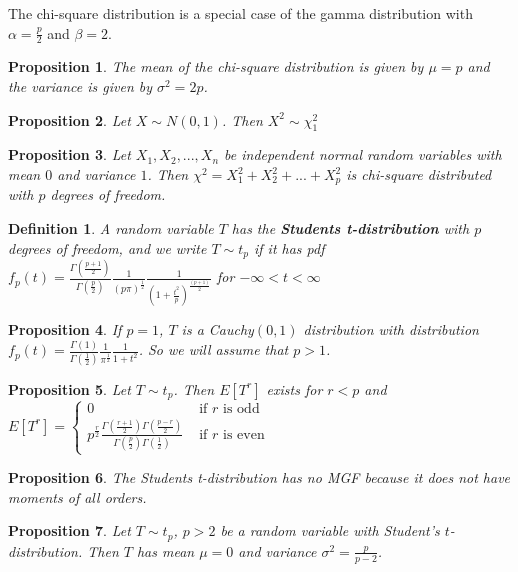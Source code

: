 \documentclass[14pt,twoside]{extreport}
\theoremstyle{dotless}
\newtheorem*{defn}{Definition}
\newtheorem*{prop}{Proposition} %
\begin{document}
The chi-square distribution is a special case of the gamma distribution with $\alpha = \frac{p}{2}$ and $\beta = 2$.

\begin{prop}
The mean of the chi-square distribution is given by $\mu = p$ and the variance is given by $\sigma^2 = 2p$.
\end{prop}

\begin{prop}
Let $X \sim N(0,1)$. Then $X^2 \sim \chi_1^2$
\end{prop}

\begin{prop}
    Let $X_1, X_2, ..., X_n$ be independent normal random variables with mean $0$ and variance $1$. Then $\chi^2 = X_1^2 + X_2^2 + ... + X_p^2$ is chi-square distributed with $p$ degrees of freedom.
\end{prop}

\begin{defn}
    A random variable $T$ has the \textbf{Students t-distribution} with $p$ degrees of freedom, and we write $T \sim t_p$ if it has pdf $f_p (t) = \displaystyle \frac{\Gamma(\frac{p+1}{2})}{\Gamma(\frac{p}{2})} \frac{1}{(p \pi)^{\frac{1}{2}}} \frac{1}{(1 + \frac{t^2}{p})^{\frac{(p+1)}{2}}} $ for $- \infty < t < \infty$
\end{defn}

\begin{prop}
    If $p=1$, $T$ is a Cauchy$(0,1)$ distribution with distribution $f_p(t) = \displaystyle\frac{\Gamma(1)}{\Gamma(\frac{1}{2})} \frac{1}{\pi^\frac{1}{2}} \frac{1}{1+t^2}$. So we will assume that $p > 1$.
\end{prop}

\begin{prop}
    Let $T \sim t_p$. Then $E[T^r]$ exists for $r < p$ and \\ $E[T^r] = \begin{cases} 0 & \text{ if } r \text{ is odd } \\   \displaystyle p^{\frac{r}{2}} \frac{\Gamma(\frac{r+1}{2})\Gamma(\frac{p-r}{2})}{\Gamma(\frac{p}{2})\Gamma(\frac{1}{2})} & \text{ if } r \text{ is even }\end{cases}$
\end{prop}

\begin{prop}
    The Students t-distribution has no MGF because it does not have moments of all orders.
\end{prop}

\begin{prop}
    Let $T \sim t_p$, $p > 2$ be a random variable with Student's $t$-distribution. Then $T$ has mean $\mu = 0$ and variance $\sigma^2 = \displaystyle \frac{p}{p-2}$.
\end{prop}
\end{document}
